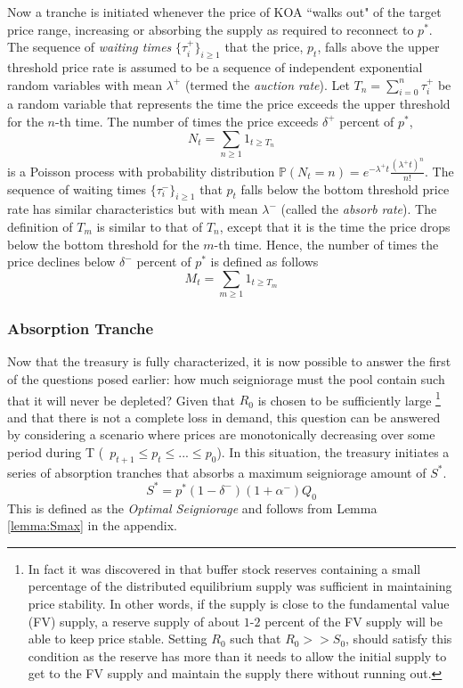 Now a tranche is initiated whenever the price of KOA ``walks out" of the target price range, increasing or absorbing the supply as required to reconnect to $p^*$. The sequence of \textit{waiting times} $\{ \tau^+_i \}_{i \geq 1}$ that the price, $p_t$, falls above the upper threshold price rate is assumed to be a sequence of independent exponential random variables with mean $\lambda^+$ (termed the \textit{auction rate}). Let $T_n = \sum_{i=0}^n \tau_i^+$  be a random variable that represents the time the price exceeds the upper threshold for the $n$-th time. The number of times the price exceeds $\delta^+$ percent of $p^*$,
%
\begin{equation} \label{eq:bullcount}
N_t = \sum_{n \geq 1} 1_{t \geq T_n} 
\end{equation}
%
is a Poisson process with probability distribution $\mathbb{P}(N_t = n) = e^{-\lambda^+ t} \frac{(\lambda^+ t)^n}{n!}$. The sequence of waiting times $\{ \tau^-_i \}_{i \geq 1}$ that $p_t$ falls below the bottom threshold price rate has similar characteristics but with mean $\lambda^-$ (called the \textit{absorb rate}). The definition of $T_m$ is similar to that of $T_n$, except that it is the time the price drops below the bottom threshold for the $m$-th time. Hence, the number of times the price declines below $\delta^-$ percent of $p^*$ is defined as follows
%
\begin{equation} \label{eq:bearcount}
M_t = \sum_{m \geq 1} 1_{t \geq T_m} 
\end{equation}

\subsubsection{Absorption Tranche}
Now that the treasury is fully characterized, it is now possible to answer the first of the questions posed earlier: how much seigniorage must the pool contain such that it will never be depleted? Given that $R_0$ is chosen to be sufficiently large%
%
\footnote{In fact it was discovered in \cite{Ath08} that buffer stock reserves containing a small percentage of the distributed equilibrium supply was sufficient in maintaining price stability. In other words, if the supply is close to the fundamental value (FV) supply, a reserve supply of about $1$-$2$ percent of the FV supply will be able to keep price stable. Setting $R_0$ such that $R_0 >> S_0$, should satisfy this condition as the reserve has more than it needs to allow the initial supply to get to the FV supply and maintain the supply there without running out.} 
%
and that there is not a complete loss in demand, this question can be answered by considering a scenario where prices are monotonically decreasing over some period during T (\ie\ $p_{t+1} \leq p_t \leq ... \leq p_0$). In this situation, the treasury initiates a series of absorption tranches that absorbs a maximum seigniorage amount of $S^*$. 
%
\begin{equation} \label{eq:Smax}
S^* = p^*(1-\delta^-)(1+\alpha^-)Q_0
\end{equation}
%
This is defined as the \textit{Optimal Seigniorage} and follows from Lemma \ref{lemma:Smax} in the appendix.

